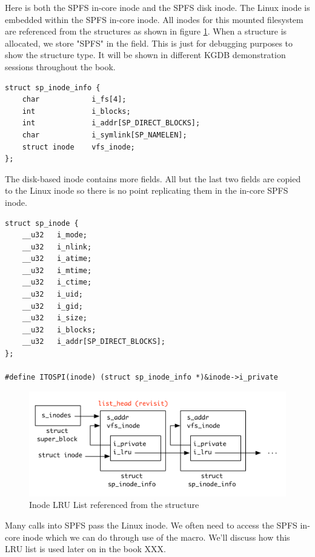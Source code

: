 Here is both the SPFS in-core inode and the SPFS disk inode. The Linux inode is embedded within the SPFS in-core inode. All inodes for this mounted filesystem are referenced from the  structures as shown in figure \ref{fig:inode-lru-list}. When a  structure is allocated, we store "SPFS" in the  field. This is just for debugging purposes to show the structure type. It will be shown in different KGDB demonstration sessions throughout the book.

\begin{lstlisting}
struct sp_inode_info {
    char            i_fs[4];
    int             i_blocks;
    int             i_addr[SP_DIRECT_BLOCKS];
    char            i_symlink[SP_NAMELEN];
    struct inode    vfs_inode;  
};
\end{lstlisting}

\noindent
The disk-based inode contains more fields. All but the last two fields are copied to the Linux inode so there is no point replicating them in the in-core SPFS inode.

\begin{lstlisting}
struct sp_inode {
	__u32	i_mode;
	__u32	i_nlink;
	__u32	i_atime;
	__u32	i_mtime;
	__u32	i_ctime;
	__u32	i_uid;
	__u32	i_gid;
	__u32	i_size;
	__u32	i_blocks;
	__u32	i_addr[SP_DIRECT_BLOCKS];
};

#define ITOSPI(inode) (struct sp_inode_info *)&inode->i_private
\end{lstlisting}

\begin{figure}
	\includegraphics[scale=0.6]{figures/inode-lru-list.pdf}
	\centering
	\caption{Inode LRU List referenced from the  structure}
	\label{fig:inode-lru-list}
\end{figure}

\noindent
Many calls into SPFS pass the Linux inode. We often need to access the SPFS in-core inode which we can do through use of the  macro. We'll discuss how this LRU list is used later on in the book XXX.

